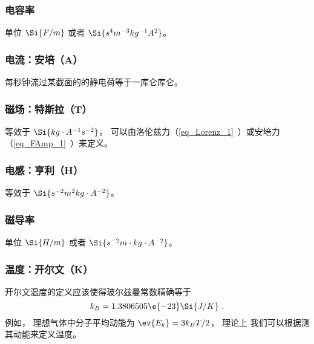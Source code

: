 \subsubsection{电容率}
单位 $\Si{F/m}$ 或者 $\Si{s^4 m^{-3} kg^{-1} A^2}$。

\subsubsection{电流：安培（A）}
每秒钟流过某截面的的静电荷等于一库仑库仑。

\subsubsection{磁场：特斯拉（T）}
等效于 $\Si{kg\cdot A^{-1}s^{-2}}$。 可以由洛伦兹力（\autoref{eq_Lorenz_1}~）或安培力（\autoref{eq_FAmp_1}~）来定义。

\subsubsection{电感：亨利（H）}
等效于 $\Si{ s^{-2}m^2 kg \cdot A^{-2}}$。

\subsubsection{磁导率}
单位 $\Si{H/m}$ 或者 $\Si{s^{-2} m \cdot kg \cdot A^{-2}}$。

\subsubsection{温度：开尔文（K）}
开尔文温度的定义应该使得玻尔兹曼常数精确等于
\begin{equation}
k_B = 1.3806505\e{-23} \Si{J/K}~.
\end{equation}
例如， 理想气体中分子平均动能为 $\ev{E_k} = 3 k_B T/2$， 理论上 我们可以根据测其动能来定义温度。
